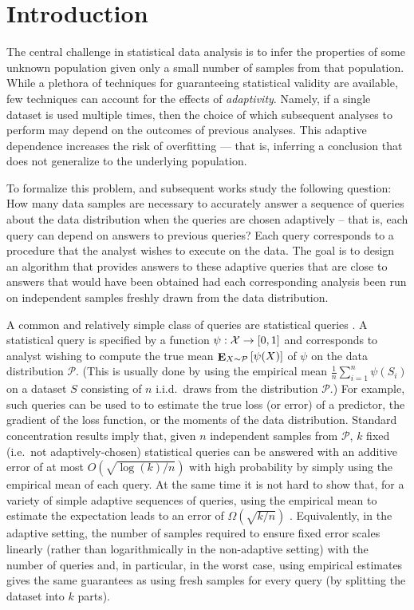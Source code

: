 \documentclass[final,12pt]{colt2018}
\newcommand{\ex}[2]{{\ifx&#1& \E \else \E_{#1} \fi \left[#2\right]}}
\providecommand\X{\mathcal{X}}
\providecommand{\cP}{{\mathcal P}}
\newcommand\blfootnote[1]{%
  \begingroup
  \renewcommand\thefootnote{}\footnote{#1}%
  \addtocounter{footnote}{-1}%
  \endgroup
}
\begin{document}

\section{Introduction}
The central challenge in statistical data analysis is to infer the properties of some unknown population given only a small number of samples from that population. While a plethora of techniques for guaranteeing statistical validity are available, few techniques can account for the effects of \emph{adaptivity}. Namely, if a single dataset is used multiple times, then the choice of which subsequent analyses to perform may depend on the outcomes of previous analyses. This adaptive dependence increases the risk of overfitting --- that is, inferring a conclusion that does not generalize to the underlying population.

To formalize this problem, \citet{DworkFHPRR14:arxiv} and subsequent works \cite[][etc.]{HardtU14,SteinkeU15,BassilyNSSSU16,FeldmanS17} study the following question: How many data samples are necessary to accurately answer a sequence of queries about the data distribution when the queries are chosen adaptively -- that is, each query can depend on answers to previous queries? Each query corresponds to a procedure that the analyst wishes to execute on the data. The goal is to design an algorithm that provides answers to these adaptive queries that are close to answers that would have been obtained had each corresponding analysis been run on independent samples freshly drawn from the data distribution.

A common and relatively simple class of queries are statistical queries \citep{Kearns:98}. A statistical query is specified by a function $\psi:\X \rar [0,1]$ and corresponds to analyst wishing to compute the true mean $\ex{X\sim \cP}{\psi(X)}$ of $\psi$ on the data distribution $\cP$. (This is usually done by using the empirical mean $\frac{1}{n} \sum_{i=1}^n \psi(S_i)$ on a dataset $S$ consisting of $n$ i.i.d.~draws from the distribution $\cP$.)  For example, such queries can be used to to estimate the true loss (or error) of a predictor, the gradient of the loss function, or the moments of the data distribution. Standard concentration results imply that, given $n$ independent samples from $\cP$, $k$ fixed (i.e.~not adaptively-chosen) statistical queries can be answered with an additive error of at most $O \left( \sqrt{\log(k)/n} \right)$ with high probability by simply using the empirical mean of each query. At the same time it is not hard to show that, for a variety of simple adaptive sequences of queries, using the empirical mean to estimate the expectation leads to an error of $\Omega(\sqrt{k/n})$ \citep{DworkFHPRR14:arxiv}. Equivalently, in the adaptive setting, the number of samples required to ensure fixed error scales linearly (rather than logarithmically in the non-adaptive setting) with the number of queries and, in particular, in the worst case, using empirical estimates gives the same guarantees as using fresh samples for every query (by splitting the dataset into $k$ parts).
\end{document}
